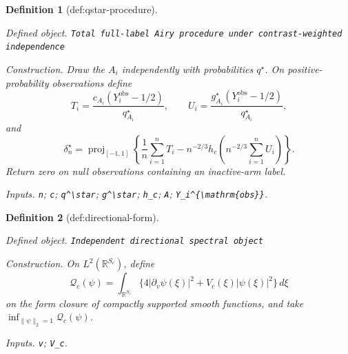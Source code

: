 \documentclass{article}
\newtheorem{definition}{Definition}
\begin{document}
\begin{definition}[def:qstar-procedure]\label{def:qstar-procedure}
\par\smallskip\noindent\emph{Defined object.} \texttt{Total full-\allowbreak{}label Airy procedure under contrast-\allowbreak{}weighted independence}
\par\smallskip\noindent\emph{Construction.} Draw the \(A_i\) independently with probabilities \(q^\star\). On positive-probability observations define \[T_i=\frac{c_{A_i}(Y_i^{\mathrm{obs}}-1/2)}{q_{A_i}^\star},\qquad U_i=\frac{g_{A_i}^\star(Y_i^{\mathrm{obs}}-1/2)}{q_{A_i}^\star},\] and \[\delta_n^\star=\operatorname{proj}_{[-1,1]}\!\left\{\frac1n\sum_{i=1}^nT_i-n^{-2/3}h_c\!\left(n^{-2/3}\sum_{i=1}^nU_i\right)\right\}.\] Return zero on null observations containing an inactive-arm label.
\par\smallskip\noindent\emph{Inputs.} \texttt{n}; \texttt{c}; \texttt{q\textasciicircum{}\textbackslash{}\allowbreak{}star}; \texttt{g\textasciicircum{}\textbackslash{}\allowbreak{}star}; \texttt{h\_\allowbreak{}c}; \texttt{A}; \texttt{Y\_\allowbreak{}i\textasciicircum{}\{\textbackslash{}\allowbreak{}mathrm\{obs\}\allowbreak{}\}\allowbreak{}}.
\end{definition}

\begin{definition}[def:directional-form]\label{def:directional-form}
\par\smallskip\noindent\emph{Defined object.} \texttt{Independent directional spectral object}
\par\smallskip\noindent\emph{Construction.} On \(L^2(\mathbb R^{S_c})\), define \[\mathcal Q_c(\psi)=\int_{\mathbb R^{S_c}}\{4|\partial_v\psi(\xi)|^2+V_c(\xi)|\psi(\xi)|^2\}\,d\xi\] on the form closure of compactly supported smooth functions, and take \(\inf_{\|\psi\|_2=1}\mathcal Q_c(\psi)\).
\par\smallskip\noindent\emph{Inputs.} \texttt{v}; \texttt{V\_\allowbreak{}c}.
\end{definition}
\end{document}
